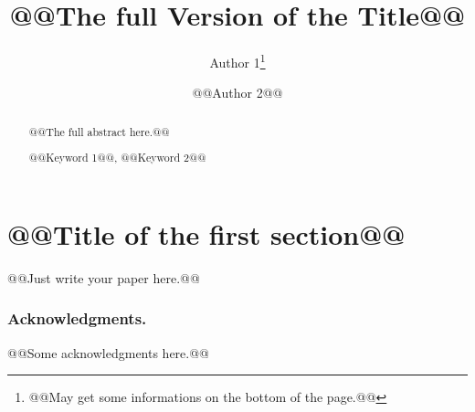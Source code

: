 \documentclass[runningheads,a4paper]{llncs}
\newcommand{\keywords}[1]{\par\addvspace\baselineskip%
\noindent\keywordname\enspace\ignorespaces#1}
\begin{document}
\mainmatter%


\title{@@The full Version of the Title@@}


\author{%
Author 1\thanks{@@May get some informations on the bottom of the page.@@}%
\and%
@@Author 2@@%
}





\maketitle

\begin{abstract}
@@The full abstract here.@@

\keywords{@@Keyword 1@@, @@Keyword 2@@}
\end{abstract}


\section{@@Title of the first section@@}

@@Just write your paper here.@@


\subsubsection*{Acknowledgments.} @@Some acknowledgments here.@@


\begin{thebibliography}{4}
\end{thebibliography}

\end{document}
